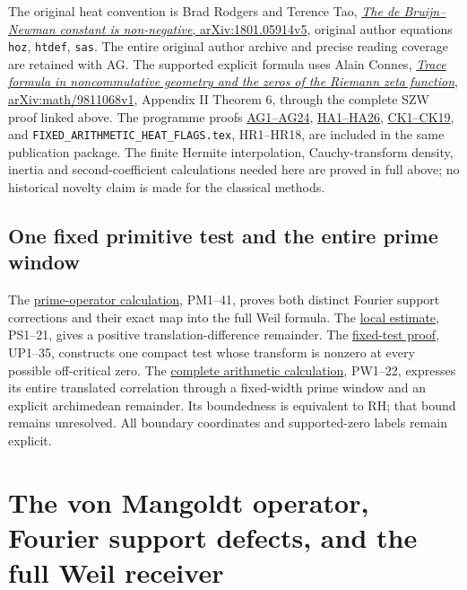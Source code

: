 \documentclass[
  10pt,
  a4paper,
]{article}
\begin{document}
The original heat convention is Brad Rodgers and Terence Tao,
\href{https://arxiv.org/abs/1801.05914v5}{\emph{The de Bruijn--Newman
constant is non-negative}, arXiv:1801.05914v5}, original author
equations \texttt{hoz}, \texttt{htdef}, \texttt{sas}. The entire
original author archive and precise reading coverage are retained with
AG. The supported explicit formula uses Alain Connes,
\href{https://arxiv.org/abs/math/9811068v1}{\emph{Trace formula in
noncommutative geometry and the zeros of the Riemann zeta function},
arXiv:math/9811068v1}, Appendix II Theorem 6, through the complete SZW
proof linked above. The programme proofs
\href{ACTUAL_HEAT_ZERO_DISTRIBUTION_VARIATION.md}{AG1--AG24},
\href{HEAT_CAUCHY_ARITHMETIC_DERIVATION.md}{HA1--HA26},
\href{CAUCHY_WEIL_POSITIVITY_CRITERION.md}{CK1--CK19}, and
\texttt{FIXED\_\allowbreak{}ARITHMETIC\_\allowbreak{}HEAT\_\allowbreak{}FLAGS.\allowbreak{}tex}, HR1--HR18, are included in
the same publication package. The finite Hermite interpolation,
Cauchy-transform density, inertia and second-coefficient calculations
needed here are proved in full above; no historical novelty claim is
made for the classical methods.

\subsection{One fixed primitive test and the entire prime
window}\label{one-fixed-primitive-test-and-the-entire-prime-window-3}

The \href{PRIME_PROJECTOR_MOBIUS_DERIVATION.md}{prime-operator
calculation}, PM1--41, proves both distinct Fourier support corrections
and their exact map into the full Weil formula. The
\href{PRIMITIVE_SHORT_SUPPORT_DERIVATION.md}{local estimate}, PS1--21,
gives a positive translation-difference remainder. The
\href{UNIVERSAL_PRIMITIVE_TRANSLATION_CRITERION.md}{fixed-test proof},
UP1--35, constructs one compact test whose transform is nonzero at every
possible off-critical zero. The
\href{PRIMITIVE_PRIME_WINDOW_DERIVATION.md}{complete arithmetic
calculation}, PW1--22, expresses its entire translated correlation
through a fixed-width prime window and an explicit archimedean
remainder. Its boundedness is equivalent to RH; that bound remains
unresolved. All boundary coordinates and supported-zero labels remain
explicit.

\clearpage

\section{The von Mangoldt operator, Fourier support defects, and the
full Weil
receiver}\label{the-von-mangoldt-operator-fourier-support-defects-and-the-full-weil-receiver}
\end{document}
